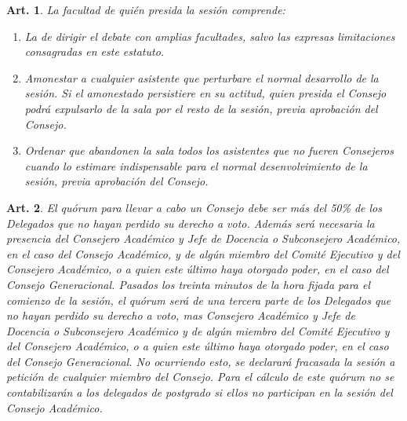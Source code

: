 \documentclass[letterpaper,11pt]{article}
\theoremstyle{plain}
\newtheorem{art}{Art.} %
\begin{document}
			\begin{art}\label{facultadesPrecide}
				La facultad de quién presida la sesión comprende:
				\begin{enumerate}
					\item La de dirigir el debate con amplias facultades, salvo las expresas limitaciones consagradas en este estatuto.
					\item Amonestar a cualquier asistente que perturbare el normal desarrollo de la sesión. Si el amonestado persistiere en su actitud,  quien presida el Consejo podrá expulsarlo de la sala por el resto de la sesión, previa aprobación del Consejo.
					\item Ordenar que abandonen la sala todos los asistentes que no fueren Consejeros cuando lo estimare indispensable para el normal desenvolvimiento de la sesión, previa aprobación del Consejo.
				\end{enumerate}
			\end{art}

			\begin{art}\label{quorumConsejo}
				El quórum para llevar a cabo un Consejo debe ser más del 50\% de los Delegados que no hayan perdido su derecho a voto. Además será necesaria la presencia del Consejero Académico y Jefe de Docencia o Subconsejero Académico, en el caso del Consejo Académico, y de algún miembro del Comité Ejecutivo y del Consejero Académico, o a quien este último haya otorgado poder, en el caso del Consejo Generacional. Pasados los treinta minutos de la hora fijada para el comienzo de la sesión, el quórum será de una tercera parte de los Delegados que no hayan perdido su derecho a voto, mas Consejero Académico y Jefe de Docencia o Subconsejero Académico y de algún miembro del Comité Ejecutivo y del Consejero Académico, o a quien este último haya otorgado poder, en el caso del Consejo Generacional. No ocurriendo esto, se declarará fracasada la sesión a petición de cualquier miembro del Consejo. Para el cálculo de este quórum no se contabilizarán a los delegados de postgrado si ellos no participan en la sesión del Consejo Académico.
			\end{art}
\end{document}
